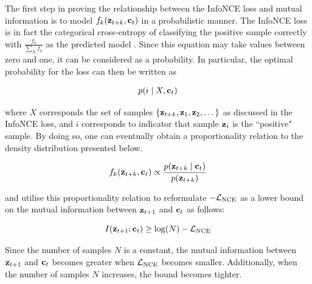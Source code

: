 	The first step in proving the relationship between the InfoNCE loss and mutual information is to model $f_k(\mathbf{z}_{t+k}, \mathbf{c}_t)$ in a probabilistic manner. The InfoNCE loss is in fact the categorical cross-entropy of classifying the positive sample correctly with $\frac{f_k}{\sum_{X} f_k}$ as the predicted model \citep{oordRepresentationLearningContrastive2019}. Since this equation may take values between zero and one, it can be considered as a probability. In particular, the optimal probability for the loss can then be written as 

	$$p(i \mid X, \mathbf{c}_t)$$
	
	where $X$ corresponds the set of samples  ${ \left\{ \mathbf{z}_{t+k}, \mathbf{z}_1, \mathbf{z}_2, \dots \right\} }$  as discussed in the InfoNCE loss, and $i$ corresponds to indicator that sample $\mathbf{z}_i$ is the ``positive" sample. By doing so, one can eventually obtain a proportionality relation to the density distribution presented below. 
	
	\begin{equation}
		f_k(\mathbf{z}_{t+k}, \mathbf{c}_t) \propto \frac{p(\mathbf{z}_{t+k} \mid \mathbf{c}_t)}{p(\mathbf{z}_{t+k})} \label{eq:fkproporational}
	\end{equation}
	
	\cite{oordRepresentationLearningContrastive2019} and \cite{lowePuttingEndEndtoEnd2020a} utilise this proportionality relation to reformulate $-\mathcal{L}_{\text{NCE}}$ as a lower bound on the mutual information between $\mathbf{z}_{t+1}$ and $\mathbf{c}_t$ as follows:
	
	\begin{equation}
		I(\mathbf{z}_{t+1}; \mathbf{c}_t) \ge \log(N) - \mathcal{L}_{\text{NCE}}
	\end{equation}

	Since the number of samples $N$ is a constant, the mutual information between $\mathbf{z}_{t+1}$ and $\mathbf{c}_t$ becomes greater when $\mathcal{L}_{\text{NCE}}$ becomes smaller. Additionally, when the number of samples $N$ increases, the bound becomes tighter.
	
			
	
	

